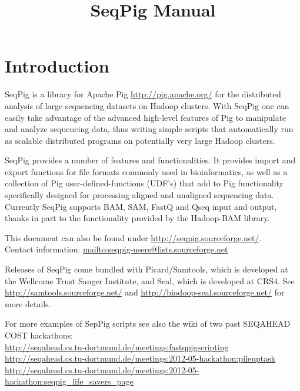 \documentclass[a4paper,10pt,bibtotoc,abstracton,oneside,noindent,DIV15]{scrartcl}
\title{SeqPig Manual}
\begin{document}
\maketitle

\tableofcontents
\newpage

\section{Introduction}

SeqPig is a library for Apache Pig \url{http://pig.apache.org/} for the
distributed analysis of large sequencing datasets on Hadoop clusters.  With
SeqPig one can easily take advantage of the advanced high-level features of Pig
to manipulate and analyze sequencing data, thus writing simple scripts that
automatically run as scalable distributed programs on potentially very large
Hadoop clusters.

SeqPig provides a number of features and functionalities.  It provides import
and export functions for file formats commonly used in bioinformatics, as well
as a collection of Pig user-defined-functions (UDF's) that add to Pig
functionality specifically designed for processing aligned and unaligned
sequencing data. Currently SeqPig supports BAM, SAM, FastQ and Qseq input and
output, thanks in part to the functionality provided by the Hadoop-BAM library.

This document can also be found under
\url{http://seqpig.sourceforge.net/}.\\ Contact information:
\url{mailto:seqpig-users@lists.sourceforge.net}

Releases of SeqPig come bundled with Picard/Samtools, which is
developed at the Wellcome Trust Sanger Institute, and Seal, which
is developed
at CRS4. See\\
\url{http://samtools.sourceforge.net/} and 
\url{http://biodoop-seal.sourceforge.net/}
for more details.

For more examples of SepPig scripts see also the wiki of two past SEQAHEAD COST hackathons:\\
\url{http://seqahead.cs.tu-dortmund.de/meetings:fastqpigscripting}\\
\url{http://seqahead.cs.tu-dortmund.de/meetings:2012-05-hackathon:pileuptask}\\
\url{http://seqahead.cs.tu-dortmund.de/meetings:2012-05-hackathon:seqpig_life_savers_page}




\end{document}
